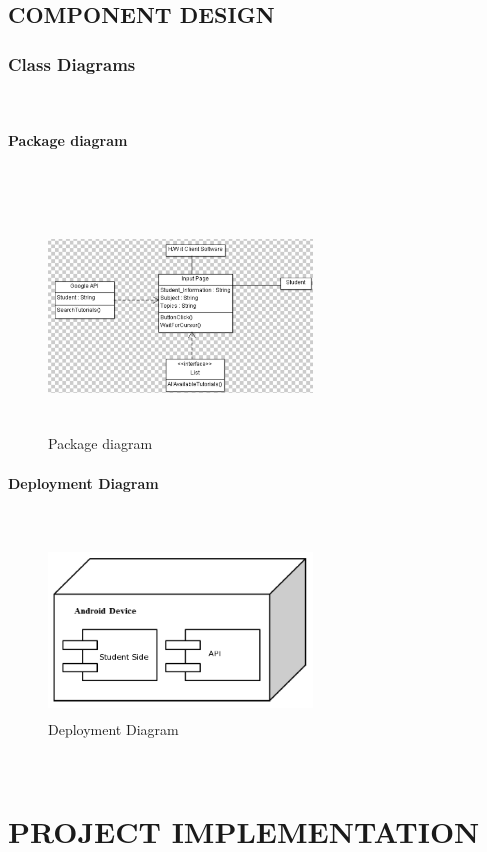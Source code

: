 \documentclass[oneside,a4paper,12pt]{report}
\begin{document}
\section{COMPONENT DESIGN}

\subsection{Class Diagrams}
\\

\subsubsection{Package diagram}
\\
\begin{figure}[!h]
\centering
\includegraphics[height=6cm,width=7cm]{class.png}
\caption{Package diagram}
\end{figure}
\subsubsection{Deployment Diagram}
\\
\begin{figure}[!h]
\centering
\includegraphics[height=4.5cm,width=7cm]{Deployment.png}
\caption{Deployment Diagram}
\end{figure}
\\
 
 
\chapter{PROJECT IMPLEMENTATION}
\newpage
\end{document}
